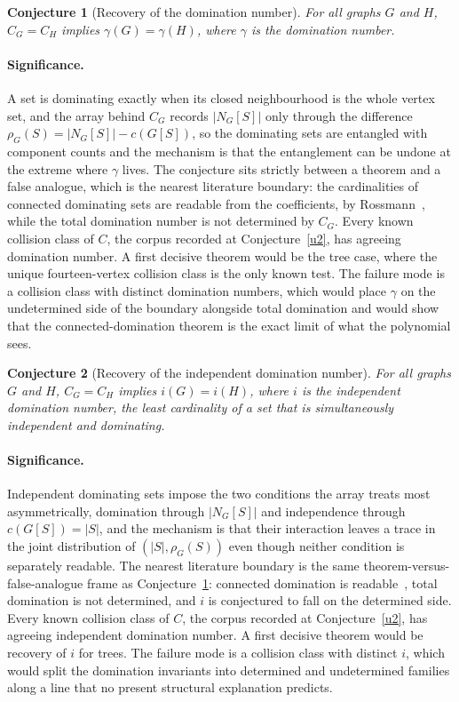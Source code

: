 \documentclass[11pt]{article}
\newtheorem{conjecture}{Conjecture}
\theoremstyle{definition}
\begin{document}
\begin{conjecture}[Recovery of the domination number]\label{u9}
For all graphs $G$ and $H$, $C_G=C_H$ implies $\gamma(G)=\gamma(H)$, where $\gamma$ is the domination number.
\end{conjecture}

\paragraph{Significance.}
A set is dominating exactly when its closed neighbourhood is the whole vertex set, and the array behind $C_G$ records $|N_G[S]|$ only through the difference $\rho_G(S)=|N_G[S]|-c(G[S])$, so the dominating sets are entangled with component counts and the mechanism is that the entanglement can be undone at the extreme where $\gamma$ lives.  The conjecture sits strictly between a theorem and a false analogue, which is the nearest literature boundary: the cardinalities of connected dominating sets are readable from the coefficients, by Rossmann~\cite{Ros22}, while the total domination number is not determined by $C_G$.  Every known collision class of $C$, the corpus recorded at Conjecture~\ref{u2}, has agreeing domination number.  A first decisive theorem would be the tree case, where the unique fourteen-vertex collision class is the only known test.  The failure mode is a collision class with distinct domination numbers, which would place $\gamma$ on the undetermined side of the boundary alongside total domination and would show that the connected-domination theorem is the exact limit of what the polynomial sees.


\begin{conjecture}[Recovery of the independent domination number]\label{u10}
For all graphs $G$ and $H$, $C_G=C_H$ implies $i(G)=i(H)$, where $i$ is the independent domination number, the least cardinality of a set that is simultaneously independent and dominating.
\end{conjecture}

\paragraph{Significance.}
Independent dominating sets impose the two conditions the array treats most asymmetrically, domination through $|N_G[S]|$ and independence through $c(G[S])=|S|$, and the mechanism is that their interaction leaves a trace in the joint distribution of $(|S|,\rho_G(S))$ even though neither condition is separately readable.  The nearest literature boundary is the same theorem-versus-false-analogue frame as Conjecture~\ref{u9}: connected domination is readable~\cite{Ros22}, total domination is not determined, and $i$ is conjectured to fall on the determined side.  Every known collision class of $C$, the corpus recorded at Conjecture~\ref{u2}, has agreeing independent domination number.  A first decisive theorem would be recovery of $i$ for trees.  The failure mode is a collision class with distinct $i$, which would split the domination invariants into determined and undetermined families along a line that no present structural explanation predicts.
\end{document}
